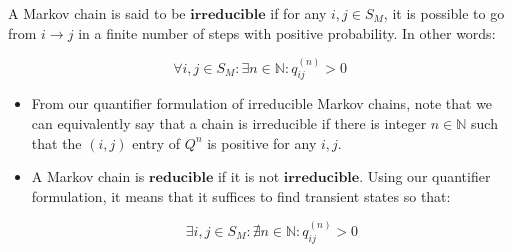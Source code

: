 \begin{definition}[Reducibility] A Markov chain is said to be $\textbf{irreducible}$ if for any $i,j \in S_M$, it is possible to go from $i \to j$ in a finite number of steps with positive probability. In other words:
\end{definition}

$$\forall i,j \in S_M: \exists n \in \mathbb{N} : q_{ij}^{(n)} > 0$$
\begin{itemize}
\item From our quantifier formulation of irreducible Markov chains, note that we can equivalently say that a chain is irreducible if there is integer $n \in \mathbb{N}$ such that the $(i,j)$ entry of $Q^n$ is positive for any $i,j$.

\item A Markov chain is $\textbf{reducible}$ if it is not $\textbf{irreducible}$. Using our quantifier formulation, it means that it suffices to find transient states so that:

$$\exists i,j \in S_M: \nexists n \in \mathbb{N} : q_{ij}^{(n)} > 0$$
\end{itemize}
